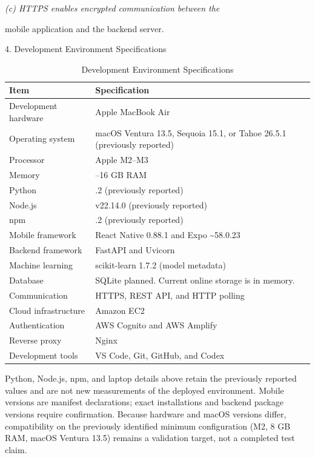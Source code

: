 \documentclass[conference]{IEEEtran}
\newlength{\tablebodywidth}
\begin{document}
\emph{(c) HTTPS enables encrypted communication between the}

mobile application and the backend server.

4. Development Environment Specifications

\begin{table}[!t]
\caption{Development Environment Specifications}
\label{tab:t1}
\centering\footnotesize
\setlength{\tabcolsep}{3pt}
\setlength{\tablebodywidth}{\dimexpr\columnwidth-12pt\relax}
\begin{tabular}{>{\raggedright\arraybackslash}p{0.330\tablebodywidth}>{\raggedright\arraybackslash}p{0.670\tablebodywidth}}
\toprule
\textbf{Item} & \textbf{Specification} \\
\midrule
Development hardware & Apple MacBook Air \\
Operating system & macOS Ventura 13.5, Sequoia 15.1, or Tahoe 26.5.1 (previously reported) \\
Processor & Apple M2--M3 \\
Memory & 8--16 GB RAM \\
Python & 3.13.2 (previously reported) \\
Node.js & v22.14.0 (previously reported) \\
npm & 10.9.2 (previously reported) \\
Mobile framework & React Native 0.88.1 and Expo \textasciitilde{}58.0.23 \\
Backend framework & FastAPI and Uvicorn \\
Machine learning & scikit-learn 1.7.2 (model metadata) \\
Database & SQLite planned. Current online storage is in memory. \\
Communication & HTTPS, REST API, and HTTP polling \\
Cloud infrastructure & Amazon EC2 \\
Authentication & AWS Cognito and AWS Amplify \\
Reverse proxy & Nginx \\
Development tools & VS Code, Git, GitHub, and Codex \\
\bottomrule
\end{tabular}
\end{table}

Python, Node.js, npm, and laptop details above retain the previously reported values and are not new measurements of the deployed environment. Mobile versions are manifest declarations; exact installations and backend package versions require confirmation. Because hardware and macOS versions differ, compatibility on the previously identified minimum configuration (M2, 8 GB RAM, macOS Ventura 13.5) remains a validation target, not a completed test claim.
\end{document}
